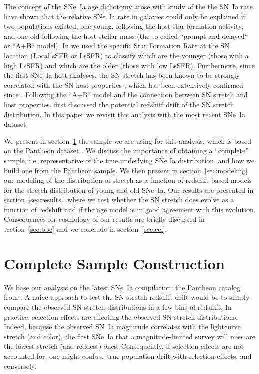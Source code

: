\documentclass[]{aa} %
\begin{document}
The concept of the SNe~Ia age dichotomy arose with study of the the SN~Ia rate.
\cite{mannucci2005, scannapieco2005, sullivan2006, aubourg2008} have shown that
the relative SNe~Ia rate in galaxies could only be explained if two populations
existed, one young, following the host star formation activity, and one old
following the host stellar mass (the so called “prompt and delayed“ or “A+B“
model). In \cite{rigault2018} we used the specific Star Formation Rate at the SN
location (Local sSFR or LsSFR) to classify which are the younger (those with a
high LsSFR) and which are the older (those with low LsSFR). Furthermore, since
the first SNe~Ia host analyses, the SN stretch has been known to be strongly
correlated with the SN host properties \citep{hamuy1996, hamuy2000}, which has
been extensively confirmed since \citep[e.g.][]{neill2009, sullivan2010,
    lampeitl2010, kelly2010, gupta2011, dandrea2011, childress2013, rigault2013,
pan2014, kim19}. Following the “A+B“ model and the connection between SN stretch
and host properties, \cite{howell2007} first discussed the potential redshift
drift of the SN stretch distribution. In this paper we revisit this analysis
with the most recent SNe~Ia dataset.

We present in section~\ref{sec:sample} the sample we are using for this
analysis, which is based on the Pantheon dataset \citep{scolnic2018a}. We
discuss the importance of obtaining a ``complete'' sample, i.e. representative of
the true underlying SNe Ia distribution, and how we build one from the Pantheon
sample.  We then present in section~\ref{sec:modeling} our modeling of the
distribution of stretch as a function of redshift based models for the stretch
distribution of young and old SNe~Ia. Our results are presented in
section~\ref{sec:results}, where we test whether the SN stretch does evolve as a
function of redshift and if the age model is in good agreement with this
evolution. Consequences for cosmology of our results are briefly discussed in
section~\ref{sec:bbc} and we conclude in section~\ref{sec:ccl}.

\section{Complete Sample Construction}\label{sec:sample}

We base our analysis on the latest SNe~Ia compilation: the Pantheon catalog from
\cite{scolnic2018a}. A naive approach to test the SN stretch redshift drift
would be to simply compare the observed SN stretch distributions in a few bins
of redshift.  In practice, selection effects are affecting the observed SN
stretch distributions. Indeed, because the observed SN~Ia magnitude correlates
with the lightcurve stretch (and color), the first SNe~Ia that a
magnitude-limited survey will miss are the lowest-stretch (and reddest) ones.
Consequently, if selection effects are not accounted for, one might confuse true
population drift with selection effects, and conversely.
\end{document}
